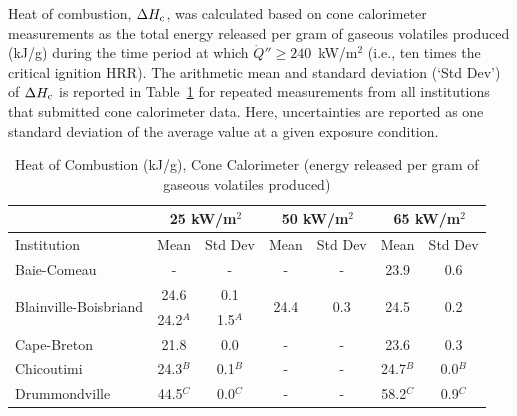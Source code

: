 \documentclass{book}
\begin{document}
Heat of combustion, $\Delta H_{\rm c}$, was calculated based on cone calorimeter measurements as the total energy released per gram of gaseous volatiles produced (kJ/g) during the time period at which $\dot{Q}'' \ge 240$~kW/m$^2$ (i.e., ten times the critical ignition HRR). The arithmetic mean and standard deviation (`Std Dev') of $\Delta H_{\rm c}$ is reported in Table~\ref{Table_13} for repeated measurements from all institutions that submitted cone calorimeter data. Here, uncertainties are reported as one standard deviation of the average value at a given exposure condition.

\begin{table}[h!]
\caption{Heat of Combustion (kJ/g), Cone Calorimeter (energy released per gram of gaseous volatiles produced)}
\label{Table_13}
\begin{center}
\begin{tabular}{|l|cc|cc|cc|}
\hline
                                        & \multicolumn{2}{|c|}{25 kW/m$^2$} &  \multicolumn{2}{|c|}{50 kW/m$^2$}             & \multicolumn{2}{|c|}{65 kW/m$^2$}                 \\ \hline
Institution                             & Mean     & Std Dev                & Mean                  & Std Dev                & Mean                  & Std Dev                   \\ \hline
Baie-Comeau                             & -        & -                      & -                     & -                      & 23.9                  & 0.6                       \\
\multirow{2}{*}{Blainville-Boisbriand}  & 24.6     & 0.1                    & \multirow{2}{*}{24.4} & \multirow{2}{*}{0.3}   & \multirow{2}{*}{24.5} & \multirow{2}{*}{0.2}      \\
                                        & 24.2$^A$ & 1.5$^A$                &                       &                        &                       &                           \\
Cape-Breton                             & 21.8     & 0.0                    & -                     & -                      & 23.6                  & 0.3                       \\
Chicoutimi                              & 24.3$^B$ & 0.1$^B$                & -                     & -                      & 24.7$^B$              & 0.0$^B$                   \\
Drummondville                           & 44.5$^C$ & 0.0$^C$                & -                     & -                      & 58.2$^C$              & 0.9$^C$                   \\

\end{tabular}
\end{center}
\end{table}
\end{document}
